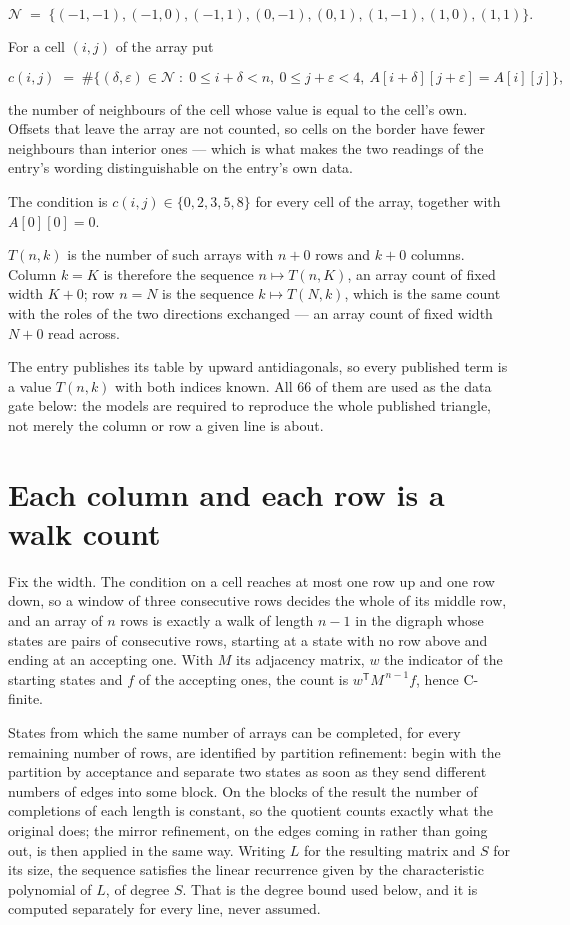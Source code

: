 \documentclass[11pt]{article}
\theoremstyle{definition}
\begin{document}
\[\mathcal{N} \;=\; \{(-1,-1), (-1,0), (-1,1), (0,-1), (0,1), (1,-1), (1,0), (1,1)\}.\]

For a cell $(i,j)$ of the array put

\[c(i,j) \;=\; \#\bigl\{(\delta,\varepsilon)\in\mathcal{N} \;:\; 0\le i+\delta<n,\ 0\le j+\varepsilon<4,\ A[i+\delta][j+\varepsilon] = A[i][j]\bigr\},\]

the number of neighbours of the cell whose value is equal to the cell's own. Offsets that leave the array are not counted, so cells on the border have fewer neighbours than interior ones --- which is what makes the two readings of the entry's wording distinguishable on the entry's own data.

The condition is $c(i,j) \in \{0, 2, 3, 5, 8\}$ for every cell of the array, together with $A[0][0]=0$.

$T(n,k)$ is the number of such arrays with $n + 0$ rows and $k + 0$ columns. Column $k = K$ is therefore the sequence $n \mapsto T(n,K)$, an array count of fixed width $K + 0$; row $n = N$ is the sequence $k \mapsto T(N,k)$, which is the same count with the roles of the two directions exchanged --- an array count of fixed width $N + 0$ read across.

The entry publishes its table by upward antidiagonals, so every published term is a value $T(n,k)$ with both indices known. All 66 of them are used as the data gate below: the models are required to reproduce the whole published triangle, not merely the column or row a given line is about.

\section{Each column and each row is a walk count}

Fix the width. The condition on a cell reaches at most one row up and one row down, so a window of three consecutive rows decides the whole of its middle row, and an array of $n$ rows is exactly a walk of length $n-1$ in the digraph whose states are pairs of consecutive rows, starting at a state with no row above and ending at an accepting one. With $M$ its adjacency matrix, $w$ the indicator of the starting states and $f$ of the accepting ones, the count is $w^{\mathsf T}M^{\,n-1}f$, hence C-finite.

States from which the same number of arrays can be completed, for every remaining number of rows, are identified by partition refinement: begin with the partition by acceptance and separate two states as soon as they send different numbers of edges into some block. On the blocks of the result the number of completions of each length is constant, so the quotient counts exactly what the original does; the mirror refinement, on the edges coming in rather than going out, is then applied in the same way. Writing $L$ for the resulting matrix and $S$ for its size, the sequence satisfies the linear recurrence given by the characteristic polynomial of $L$, of degree $S$. That is the degree bound used below, and it is computed separately for every line, never assumed.
\end{document}
